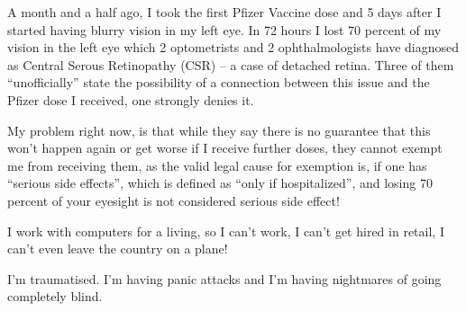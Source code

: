A month and a half ago, I took the first Pfizer Vaccine dose and 5 days after I
started having blurry vision in my left eye. In 72 hours I lost 70 percent of my
vision in the left eye which 2 optometrists and 2 ophthalmologists have
diagnosed as Central Serous Retinopathy (CSR) – a case of detached retina. Three
of them “unofficially” state the possibility of a connection between this issue
and the Pfizer dose I received, one strongly denies it.

My problem right now, is that while they say there is no guarantee that this
won’t happen again or get worse if I receive further doses, they cannot exempt
me from receiving them, as the valid legal cause for exemption is, if one has
“serious side effects”, which is defined as “only if hospitalized”, and losing
70 percent of your eyesight is not considered serious side effect!

I work with computers for a living, so I can’t work, I can’t get hired in
retail, I can’t even leave the country on a plane!

I’m traumatised. I’m having panic attacks and I’m having nightmares of going
completely blind.
